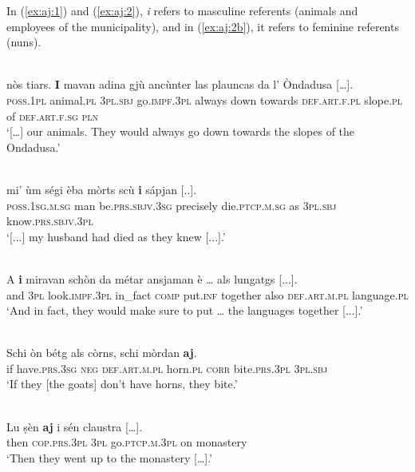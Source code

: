 In (\ref{ex:aj:1}) and (\ref{ex:aj:2}), \textit{i } refers to masculine referents (animals and employees of the municipality), and in (\ref{ex:aj:2b}), it refers to feminine referents (nuns).

\ea
\label{ex:aj:1}
\\
\gll  […] nòs tiars. \textbf{I} mavan adina gjù ancùnter las  plauncas  da l’ Òndadusa […].\\
{} \textsc{poss.1pl} animal.\textsc{pl} \textsc{3pl.sbj} go.\textsc{impf.3pl} always down towards \textsc{def.art.f.pl} slope.\textsc{pl} of \textsc{def.art.f.sg} \textsc{pln}\\
\glt `[…] our animals. They would always go down towards the slopes of the Ondadusa.'
\z

\ea
\label{ex:aj:2}
\\ 
\gll  [...] mi' ùm ségi èba mòrts scù \textbf{i} sápjan [..].\\
{} \textsc{poss.1sg.m.sg} man be.\textsc{prs.sbjv.3sg} precisely die.\textsc{ptcp.m.sg} as \textsc{3pl.sbj} know.\textsc{prs.sbjv.3pl}\\
\glt `[...] my husband had died as they knew [...].'
\z

\ea
\label{ex:aj:2b}
\\ 
\gll    A \textbf{i} miravan schòn da métar ansjaman è … als lungatgs [...].\\
and \textsc{3pl} look.\textsc{impf.3pl} in\_fact \textsc{comp} put.\textsc{inf} together also {} \textsc{def.art.m.pl} language.\textsc{pl}\\
\glt `And in fact, they would make sure to put … the languages together [...].'
\z

\ea
\label{ex:aj:3}
\\
\gll  Schi òn bétg als còrns, schi mòrdan \textbf{aj}.  \\
     if have.\textsc{prs.3sg} \textsc{neg} \textsc{def.art.m.pl} horn.\textsc{pl} \textsc{corr} bite.\textsc{prs.3pl} \textsc{3pl.sbj}\\
\glt `If they [the goats] don’t have horns, they bite.'
\z

\ea
\label{ex:aj:4}
\\
\gll Lu ṣèn \textbf{aj} i sén claustra […].\\
then \textsc{cop.prs.3pl} \textsc{3pl}  go.\textsc{ptcp.m.3pl} on monastery\\
\glt `Then they went up to the monastery […].'
\z

